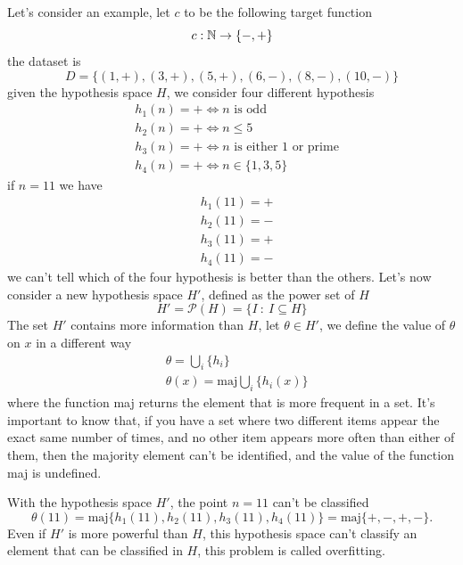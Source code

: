 \documentclass[10pt, letterpaper]{report}
\begin{document}
Let's consider an example, let $c$ to be the following target function\begin{equation}
	c:{\mathbb N}\rightarrow\{-,+\}
\end{equation}
the dataset is\begin{equation}
	D=\{(1,+),(3,+),(5,+),(6,-),
	(8,-),(10,-)\}
\end{equation}
given the hypothesis space $H$, we consider four different hypothesis\begin{align*}
	 & h_1(n)=+\iff n\text{ is odd}               \\
	 & h_2(n)=+\iff n\le 5                        \\
	 & h_3(n)=+\iff n\text{ is either 1 or prime} \\
	 & h_4(n)=+\iff n\in\{1,3,5\}
\end{align*}
if $n=11$ we have\begin{align*}
	 & h_1(11)=+ \\
	 & h_2(11)=- \\
	 & h_3(11)=+ \\
	 & h_4(11)=-
\end{align*}
we can't tell which of the four hypothesis is better than the others. Let's now consider a new hypothesis space $H'$, defined as the power set of $H$\begin{equation}
	H'=\mathcal P(H)=\{I \ : \ I\subseteq H\}
\end{equation}
The set $H'$ contains more information than $H$, let $\theta\in H'$, we define the value of $\theta$ on $x$ in a different way\begin{align}
	 & \theta = \bigcup_i\{h_i\}               \\
	 & \theta(x)=\text{maj}\bigcup_i\{h_i(x)\}
\end{align}
where the function maj returns the element that is more frequent in a set. It's important to know that, if you have a set where two different items appear the exact same number of times, and no other item appears more often than either of them, then the majority element can't be identified, and the value of the function maj is undefined.\bigskip

With the hypothesis space $H'$, the point $n=11$ can't be classified\begin{equation}
	\theta(11)=\text{maj}\{h_1(11),h_2(11),h_3(11),h_4(11)\}=\text{maj}\{+,-,+,-\}.
\end{equation}
Even if $H'$ is more powerful than $H$, this hypothesis space can't classify an element that can be classified in $H$, this problem is called overfitting.\bigskip
\end{document}
